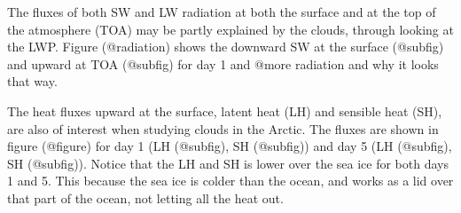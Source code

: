 The fluxes of both SW and LW radiation at both the surface and at the top of the atmosphere (TOA) may be partly explained by the clouds, through looking at the LWP. Figure (@radiation) shows the downward SW at the surface (@subfig) and upward at TOA (@subfig) for day 1 and @more radiation and why it looks that way.

The heat fluxes upward at the surface, latent heat (LH) and sensible heat (SH), are also of interest when studying clouds in the Arctic. The fluxes are shown in figure (@figure) for day 1 (LH (@subfig), SH (@subfig)) and day 5 (LH (@subfig), SH (@subfig)). Notice that the LH and SH is lower over the sea ice for both days 1 and 5. This because the sea ice is colder than the ocean, and works as a lid over that part of the ocean, not letting all the heat out.

